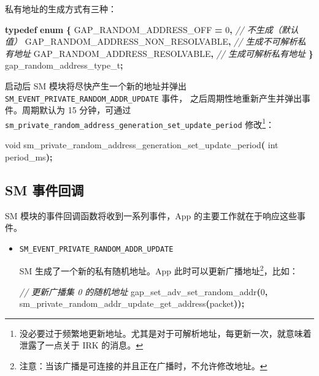 \documentclass[
  12pt,
]{book}
\newenvironment{Shaded}{\begin{snugshade}}{\end{snugshade}}
\newcommand{\CommentTok}[1]{\textcolor[rgb]{0.56,0.35,0.01}{\textit{#1}}}
\newcommand{\DataTypeTok}[1]{\textcolor[rgb]{0.13,0.29,0.53}{#1}}
\newcommand{\DecValTok}[1]{\textcolor[rgb]{0.00,0.00,0.81}{#1}}
\newcommand{\KeywordTok}[1]{\textcolor[rgb]{0.13,0.29,0.53}{\textbf{#1}}}
\newcommand{\NormalTok}[1]{#1}
\newcommand{\OperatorTok}[1]{\textcolor[rgb]{0.81,0.36,0.00}{\textbf{#1}}}
\begin{document}
私有地址的生成方式有三种：

\begin{Shaded}
\begin{Highlighting}[]
\KeywordTok{typedef} \KeywordTok{enum} \OperatorTok{\{}
\NormalTok{  GAP\_RANDOM\_ADDRESS\_OFF }\OperatorTok{=} \DecValTok{0}\OperatorTok{,}         \CommentTok{// 不生成（默认值）}
\NormalTok{  GAP\_RANDOM\_ADDRESS\_NON\_RESOLVABLE}\OperatorTok{,}  \CommentTok{// 生成不可解析私有地址}
\NormalTok{  GAP\_RANDOM\_ADDRESS\_RESOLVABLE}\OperatorTok{,}      \CommentTok{// 生成可解析私有地址}
\OperatorTok{\}}\NormalTok{ gap\_random\_address\_type\_t}\OperatorTok{;}
\end{Highlighting}
\end{Shaded}

启动后 SM 模块将尽快产生一个新的地址并弹出 \texttt{SM\_EVENT\_PRIVATE\_RANDOM\_ADDR\_UPDATE} 事件，
之后周期性地重新产生并弹出事件。周期默认为 15 分钟，可通过 \texttt{sm\_private\_random\_address\_generation\_set\_update\_period}
修改\footnote{没必要过于频繁地更新地址。尤其是对于可解析地址，每更新一次，就意味着泄露了一点关于 IRK 的消息。}：

\begin{Shaded}
\begin{Highlighting}[]
\DataTypeTok{void}\NormalTok{ sm\_private\_random\_address\_generation\_set\_update\_period}\OperatorTok{(}
  \DataTypeTok{int}\NormalTok{ period\_ms}\OperatorTok{);}
\end{Highlighting}
\end{Shaded}

\hypertarget{sm-ux4e8bux4ef6ux56deux8c03}{%
\subsection{SM 事件回调}\label{sm-ux4e8bux4ef6ux56deux8c03}}

SM 模块的事件回调函数将收到一系列事件，App 的主要工作就在于响应这些事件。

\begin{itemize}
\item
  \texttt{SM\_EVENT\_PRIVATE\_RANDOM\_ADDR\_UPDATE}

  SM 生成了一个新的私有随机地址。App 此时可以更新广播地址\footnote{注意：当该广播是可连接的并且正在广播时，不允许修改地址。}，比如：

\begin{Shaded}
\begin{Highlighting}[]
\CommentTok{// 更新广播集 0 的随机地址}
\NormalTok{gap\_set\_adv\_set\_random\_addr}\OperatorTok{(}\DecValTok{0}\OperatorTok{,}
\NormalTok{  sm\_private\_random\_addr\_update\_get\_address}\OperatorTok{(}\NormalTok{packet}\OperatorTok{));}
\end{Highlighting}
\end{Shaded}
\end{itemize}
\end{document}
